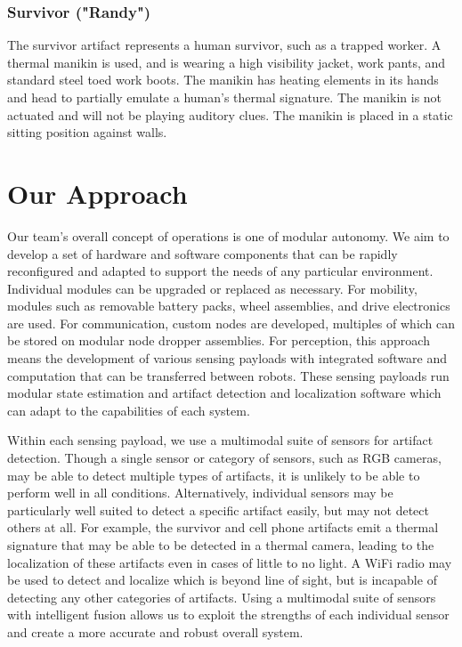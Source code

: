 \subsubsection{Survivor ("Randy")}

The survivor artifact represents a human survivor, such as a trapped worker. A thermal manikin is used, and is wearing a high visibility jacket, work pants, and standard steel toed work boots. The manikin has heating elements in its hands and head to partially emulate a human's thermal signature. The manikin is not actuated and will not be playing auditory clues. The manikin is placed in a static sitting position against walls.

\section{Our Approach}

Our team's overall concept of operations is one of modular autonomy. We aim to develop a set of hardware and software components that can be rapidly reconfigured and adapted to support the needs of any particular environment. Individual modules can be upgraded or replaced as necessary. For mobility, modules such as removable battery packs, wheel assemblies, and drive electronics are used. For communication, custom nodes are developed, multiples of which can be stored on modular node dropper assemblies. For perception, this approach means the development of various sensing payloads with integrated software and computation that can be transferred between robots. These sensing payloads run modular state estimation and artifact detection and localization software which can adapt to the capabilities of each system.

Within each sensing payload, we use a multimodal suite of sensors for artifact detection. Though a single sensor or category of sensors, such as RGB cameras, may be able to detect multiple types of artifacts, it is unlikely to be able to perform well in all conditions. Alternatively, individual sensors may be particularly well suited to detect a specific artifact easily, but may not detect others at all. For example, the survivor and cell phone artifacts emit a thermal signature that may be able to be detected in a thermal camera, leading to the localization of these artifacts even in cases of little to no light. A WiFi radio may be used to detect and localize which is beyond line of sight, but is incapable of detecting any other categories of artifacts. Using a multimodal suite of sensors with intelligent fusion allows us to exploit the strengths of each individual sensor and create a more accurate and robust overall system.

